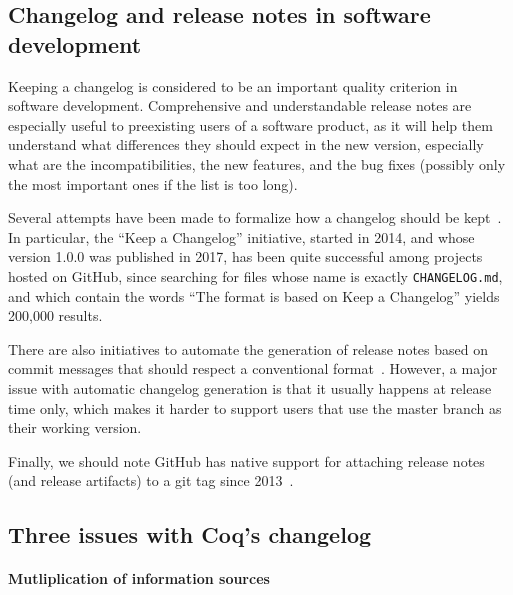 \label{sec:release-notes}

\subsection{Changelog and release notes in software development}

Keeping a changelog is considered to be an important quality criterion in software development.
Comprehensive and understandable release notes are especially useful to preexisting users of a software product, as it will help them understand what differences they should expect in the new version, especially what are the incompatibilities, the new features, and the bug fixes (possibly only the most important ones if the list is too long).

Several attempts have been made to formalize how a changelog should be kept~\cite{gnu_changelog,keep_a_changelog}.
In particular, the ``Keep a Changelog'' initiative, started in 2014, and whose version 1.0.0 was published in 2017, has been quite successful among projects hosted on GitHub, since searching for files whose name is exactly \verb|CHANGELOG.md|, and which contain the words ``The format is based on Keep a Changelog'' yields 200,000 results.

There are also initiatives to automate the generation of release notes based on commit messages that should respect a conventional format~\cite{conventional_changelog}.
However, a major issue with automatic changelog generation is that it usually happens at release time only, which makes it harder to support users that use the master branch as their working version.

Finally, we should note GitHub has native support for attaching release notes (and release artifacts) to a git tag since 2013~\cite{github_releases}.

\subsection{Three issues with Coq's changelog}

\label{sec:changelog-issues}

\paragraph{Mutliplication of information sources}

